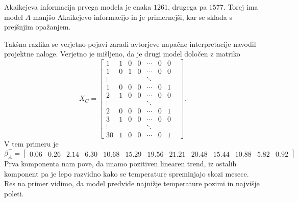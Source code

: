 \documentclass[12pt, a4paper]{article}
\begin{document}
Akaikejeva informacija prvega modela je enaka $1261$,
drugega pa $1577$. Torej ima model $A$
manjšo Akaikejevo informacijo in je primernejši, kar se sklada s 
prejšnjim opažanjem.

Takšna razlika se verjetno pojavi zaradi avtorjeve napačne interpretacije navodil 
projektne naloge. Verjetno je mišljeno, da je drugi model določen z matriko
\[
    X_C = \begin{bmatrix}
        1 & 1 & 0 & 0 & \cdots & 0 & 0 \\
        1 & 0 & 1 & 0 & \cdots & 0 & 0 \\
        \vdots & & & & \ddots & & & \\
        1 & 0 & 0 & 0 & \cdots & 0 & 1 \\
        2 & 1 & 0 & 0 & \cdots & 0 & 0 \\
        \vdots & & & & \ddots & & & \\
        2 & 0 & 0 & 0 & \cdots & 0 & 1 \\
        3 & 1 & 0 & 0 & \cdots & 0 & 0 \\
        \vdots & & & & \ddots & & & \\
        30 & 1 & 0 & 0 & \cdots & 0 & 1 
    \end{bmatrix}.
\]
V tem primeru je
\footnotesize
\[
    \beta_A^\top = \begin{bmatrix}
        0.06 & 0.26 & 2.14 & 6.30 & 10.68 & 15.29 & 
        19.56 & 21.21 & 20.48 & 15.44 & 10.88 & 5.82 & 0.92
    \end{bmatrix}
\]
\normalsize
Prva komponenta nam pove, da imamo pozitiven linearen trend, 
iz ostalih komponent pa je lepo razvidno kako se temperature
spreminjajo skozi mesece. Res na primer vidimo, da model 
predvide najnižje temperature pozimi in najvišje poleti.
\end{document}
